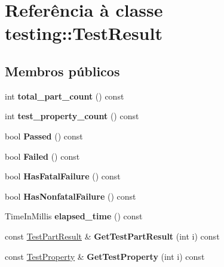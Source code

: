 \hypertarget{classtesting_1_1TestResult}{\section{Referência à classe testing\-:\-:Test\-Result}
\label{classtesting_1_1TestResult}
}
\subsection*{Membros públicos}
\begin{DoxyCompactItemize}
\item 
\hypertarget{classtesting_1_1TestResult_ae6a378ec743edfbed55890c955d0adc8}{int {\bfseries total\-\_\-part\-\_\-count} () const }\label{classtesting_1_1TestResult_ae6a378ec743edfbed55890c955d0adc8}

\item 
\hypertarget{classtesting_1_1TestResult_a5075f9d595d51c7cc2f5c0921e622831}{int {\bfseries test\-\_\-property\-\_\-count} () const }\label{classtesting_1_1TestResult_a5075f9d595d51c7cc2f5c0921e622831}

\item 
\hypertarget{classtesting_1_1TestResult_aa46a04342f02ec297357f47288da3ef3}{bool {\bfseries Passed} () const }\label{classtesting_1_1TestResult_aa46a04342f02ec297357f47288da3ef3}

\item 
\hypertarget{classtesting_1_1TestResult_abb5d051bf958071c14020132a4d6cc07}{bool {\bfseries Failed} () const }\label{classtesting_1_1TestResult_abb5d051bf958071c14020132a4d6cc07}

\item 
\hypertarget{classtesting_1_1TestResult_ace61ce992083a9124f9ff0e99a2041cc}{bool {\bfseries Has\-Fatal\-Failure} () const }\label{classtesting_1_1TestResult_ace61ce992083a9124f9ff0e99a2041cc}

\item 
\hypertarget{classtesting_1_1TestResult_a34e6901b9772f51ce4f17a5517c26607}{bool {\bfseries Has\-Nonfatal\-Failure} () const }\label{classtesting_1_1TestResult_a34e6901b9772f51ce4f17a5517c26607}

\item 
\hypertarget{classtesting_1_1TestResult_a582f6383265d0619df812b75499d0616}{Time\-In\-Millis {\bfseries elapsed\-\_\-time} () const }\label{classtesting_1_1TestResult_a582f6383265d0619df812b75499d0616}

\item 
\hypertarget{classtesting_1_1TestResult_a08b680f63d91391db4161f909da2bbcc}{const \hyperlink{classtesting_1_1TestPartResult}{Test\-Part\-Result} \& {\bfseries Get\-Test\-Part\-Result} (int i) const }\label{classtesting_1_1TestResult_a08b680f63d91391db4161f909da2bbcc}

\item 
\hypertarget{classtesting_1_1TestResult_a2cb23a457a444ba85684dd655895f08e}{const \hyperlink{classtesting_1_1TestProperty}{Test\-Property} \& {\bfseries Get\-Test\-Property} (int i) const }\label{classtesting_1_1TestResult_a2cb23a457a444ba85684dd655895f08e}

\end{DoxyCompactItemize}
